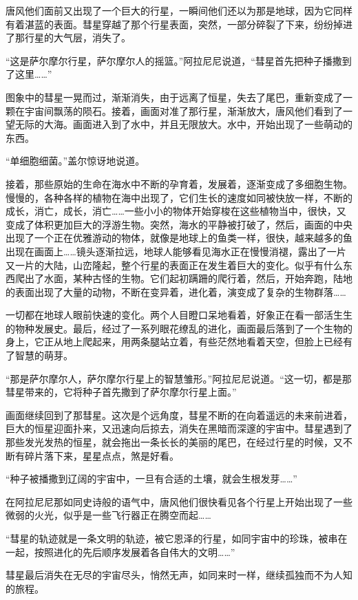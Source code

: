 唐风他们面前又出现了一个巨大的行星，一瞬间他们还以为那是地球，因为它同样有着湛蓝的表面。彗星穿越了那个行星表面，突然，一部分碎裂了下来，纷纷掉进了那行星的大气层，消失了。

“这是萨尔摩尔行星，萨尔摩尔人的摇篮。”阿拉尼尼说道，“彗星首先把种子播撒到了这里……”

图象中的彗星一晃而过，渐渐消失，由于远离了恒星，失去了尾巴，重新变成了一颗在宇宙间飘荡的陨石。接着，画面对准了那行星，渐渐放大，唐风他们看到了一望无际的大海。画面进入到了水中，并且无限放大。水中，开始出现了一些萌动的东西。

“单细胞细菌。”盖尔惊讶地说道。

接着，那些原始的生命在海水中不断的孕育着，发展着，逐渐变成了多细胞生物。慢慢的，各种各样的植物在海中出现了，它们生长的速度如同被快放一样，不断的成长，消亡，成长，消亡……一些小小的物体开始穿梭在这些植物当中，很快，又变成了体积更加巨大的浮游生物。突然，海水的平静被打破了，然后，画面的中央出现了一个正在优雅游动的物体，就像是地球上的鱼类一样，很快，越来越多的鱼出现在画面上……镜头逐渐拉远，地球人能够看见海水正在慢慢消褪，露出了一片又一片的大陆，山峦隆起，整个行星的表面正在发生着巨大的变化。似乎有什么东西爬出了水面，某种古怪的生物。它们起初蹒跚的爬行着，然后，开始奔跑，陆地的表面出现了大量的动物，不断在变异着，进化着，演变成了复杂的生物群落……

一切都在地球人眼前快速的变化。两个人目瞪口呆地看着，好象正在看一部活生生的物种发展史。最后，经过了一系列眼花缭乱的进化，画面最后落到了一个生物的身上，它正从地上爬起来，用两条腿站立着，有些茫然地看着天空，但脸上已经有了智慧的萌芽。

“那是萨尔摩尔人，萨尔摩尔行星上的智慧雏形。”阿拉尼尼说道。“这一切，都是那彗星带来的，它将种子首先撒到了萨尔摩尔行星上面。”

画面继续回到了那彗星。这次是个远角度，彗星不断的在向着遥远的未来前进着，巨大的恒星迎面扑来，又迅速向后掠去，消失在黑暗而深邃的宇宙中。彗星遇到了那些发光发热的恒星，就会拖出一条长长的美丽的尾巴，在经过行星的时候，又不断有碎片落下来，星星点点，煞是好看。

“种子被播撒到辽阔的宇宙中，一旦有合适的土壤，就会生根发芽……”

在阿拉尼尼那如同史诗般的语气中，唐风他们很快看见各个行星上开始出现了一些微弱的火光，似乎是一些飞行器正在腾空而起……

“彗星的轨迹就是一条文明的轨迹，被它恩泽的行星，如同宇宙中的珍珠，被串在一起，按照进化的先后顺序发展着各自伟大的文明……”

彗星最后消失在无尽的宇宙尽头，悄然无声，如同来时一样，继续孤独而不为人知的旅程。

